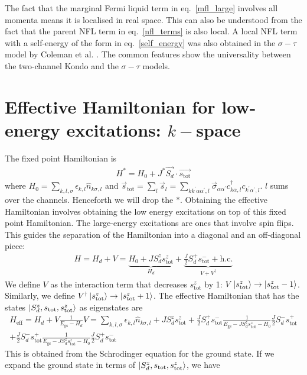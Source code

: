 \documentclass{revtex4-2}
\begin{document}
The fact that the marginal Fermi liquid term in eq.~\ref{mfl_large} involves all momenta means it is localised in real space. This can also be understood from the fact that the parent NFL term in eq.~\ref{nfl_terms} is also local. A local NFL term with a self-energy of the form in eq.~\ref{self_energy} was also obtained in the \(\sigma-\tau\) model by Coleman et al. \cite{Coleman_tsvelik}. The common features show the universality between the two-channel Kondo and the \(\sigma-\tau\) models.
\section{Effective Hamiltonian for low-energy excitations: \(k-\)space}
The fixed point Hamiltonian is
\begin{align}
	H^* = H_0 + J^* \vec{S_d}\cdot\vec{s_\text{tot}}
\end{align}
where \(H_0 = \sum_{k,l,\sigma}\epsilon_{k,l}\hat n_{k\sigma,l}\) and \(\vec s_\text{tot} = \sum_l \vec s_l = \sum_{kk^\prime\alpha\alpha^\prime,l} \vec \sigma_{\alpha\alpha^\prime}c^\dagger_{k\alpha,l}c_{k^\prime\alpha^\prime,l}\). \(l\) sums over the channels. Henceforth we will drop the \(*\). Obtaining the effective Hamiltonian involves obtaining the low energy excitations on top of this fixed point Hamiltonian. The large-energy excitations are ones that involve spin flips. This guides the separation of the Hamiltonian into a diagonal and an off-diagonal piece:
\begin{align}
	H = H_d + V = \underbrace{H_0 + J S_d^z s_\text{tot}^z}_{H_d} + \underbrace{\frac{J}{2}S_d^+ s_\text{tot}^- + \text{h.c.}}_{V + V^\dagger}
\end{align}
We define \(V\) as the interaction term that decreases \(s_\text{tot}^z\) by 1: \(V \ket{s_\text{tot}^z} \to \ket{s_\text{tot}^z - 1}\). Similarly, we define \(V^\dagger \ket{s_\text{tot}^z} \to \ket{s_\text{tot}^z + 1}\). The effective Hamiltonian that has the states \(\ket{S_d^z, s_\text{tot}, s_\text{tot}^z}\) as eigenstates are
\begin{align}
	H_\text{eff} = H_d + V \frac{1}{E_\text{gs} - H_d}V = \sum_{k,l,\sigma}\epsilon_{k,l}\hat n_{k\sigma,l} + J S_d^z s_\text{tot}^z + \frac{J}{2}S_d^+ s_\text{tot}^- \frac{1}{E_\text{gs} - J S_d^z s_\text{tot}^z - H_0}\frac{J}{2}S_d^- s_\text{tot}^+\\
	+\frac{J}{2}S_d^- s_\text{tot}^+ \frac{1}{E_\text{gs} - J S_d^z s_\text{tot}^z - H_0}\frac{J}{2}S_d^+ s_\text{tot}^-
\end{align}
This is obtained from the Schrodinger equation for the ground state. If we expand the ground state in terms of \(\ket{S_d^z, s_\text{tot}, s_\text{tot}^z}\), we have 
\end{document}

